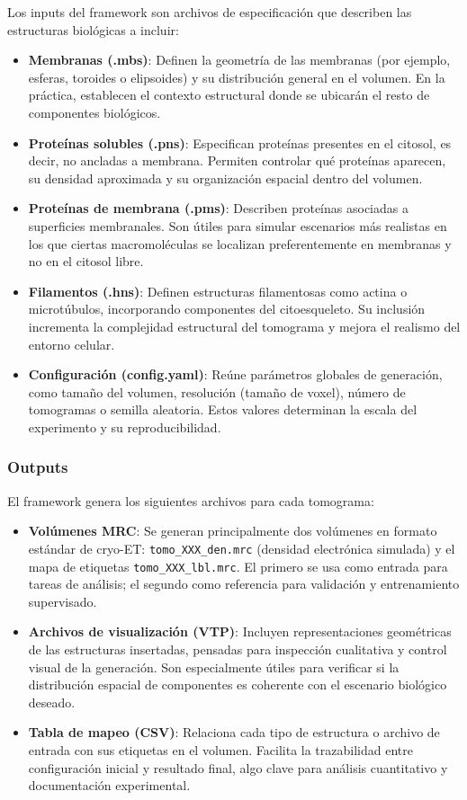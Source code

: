 Los inputs del framework son archivos de especificación que describen las estructuras biológicas a incluir:

\begin{itemize}
    \item \textbf{Membranas (.mbs)}: Definen la geometría de las membranas (por ejemplo, esferas, toroides o elipsoides) y su distribución general en el volumen. En la práctica, establecen el contexto estructural donde se ubicarán el resto de componentes biológicos.
    \item \textbf{Proteínas solubles (.pns)}: Especifican proteínas presentes en el citosol, es decir, no ancladas a membrana. Permiten controlar qué proteínas aparecen, su densidad aproximada y su organización espacial dentro del volumen.
    \item \textbf{Proteínas de membrana (.pms)}: Describen proteínas asociadas a superficies membranales. Son útiles para simular escenarios más realistas en los que ciertas macromoléculas se localizan preferentemente en membranas y no en el citosol libre.
    \item \textbf{Filamentos (.hns)}: Definen estructuras filamentosas como actina o microtúbulos, incorporando componentes del citoesqueleto. Su inclusión incrementa la complejidad estructural del tomograma y mejora el realismo del entorno celular.
    \item \textbf{Configuración (config.yaml)}: Reúne parámetros globales de generación, como tamaño del volumen, resolución (tamaño de voxel), número de tomogramas o semilla aleatoria. Estos valores determinan la escala del experimento y su reproducibilidad.
\end{itemize}

\subsubsection{Outputs}

El framework genera los siguientes archivos para cada tomograma:

\begin{itemize}
    \item \textbf{Volúmenes MRC}: Se generan principalmente dos volúmenes en formato estándar de cryo-ET: \texttt{tomo\_XXX\_den.mrc} (densidad electrónica simulada) y el mapa de etiquetas \texttt{tomo\_XXX\_lbl.mrc}. El primero se usa como entrada para tareas de análisis; el segundo como referencia para validación y entrenamiento supervisado.
    \item \textbf{Archivos de visualización (VTP)}: Incluyen representaciones geométricas de las estructuras insertadas, pensadas para inspección cualitativa y control visual de la generación. Son especialmente útiles para verificar si la distribución espacial de componentes es coherente con el escenario biológico deseado.
    \item \textbf{Tabla de mapeo (CSV)}: Relaciona cada tipo de estructura o archivo de entrada con sus etiquetas en el volumen. Facilita la trazabilidad entre configuración inicial y resultado final, algo clave para análisis cuantitativo y documentación experimental.
\end{itemize}

